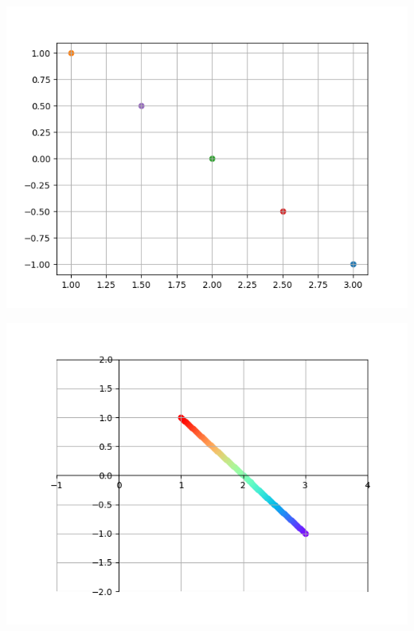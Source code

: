 \setlength\columnsep{-100pt}
\begin{multicols}{2}
	
	\columnbreak
	\centering
	\includegraphics[scale=.7]{segment.png}
\end{multicols}
\newpage
\begin{multicols}{2}
	\columnbreak
	\centering
	\includegraphics[scale=.7]{segment-ameliore.png}
\end{multicols}


